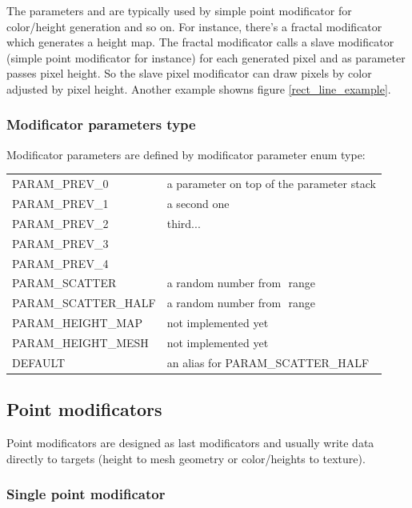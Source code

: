 \documentclass[9pt]{article}
\begin{document}
The parameters and are typically used by simple point modificator 
for color/height generation and so on. For instance, there's a fractal
modificator which generates a height map. The fractal modificator calls
a slave modificator (simple point modificator for instance) for each generated 
pixel and as parameter passes pixel height. So the slave pixel modificator can 
draw pixels by color adjusted by pixel height. Another example showns 
figure \ref{rect_line_example}.

\subsubsection*{Modificator parameters type}

Modificator parameters are defined by modificator parameter enum type:
\begin{center}
\begin{tabular}{|l||l|}
PARAM\_PREV\_0 & a parameter on top of the parameter stack \\
PARAM\_PREV\_1 & a second one \\
PARAM\_PREV\_2 & third... \\
PARAM\_PREV\_3 & \\
PARAM\_PREV\_4 & \\
PARAM\_SCATTER & a random number from \begin{math}<-1,1>\end{math} range \\
PARAM\_SCATTER\_HALF & a random number from \begin{math}<0,1>\end{math} range \\
PARAM\_HEIGHT\_MAP & not implemented yet \\
PARAM\_HEIGHT\_MESH & not implemented yet \\
DEFAULT & an alias for PARAM\_SCATTER\_HALF \\
\end{tabular}
\end{center}

\subsection{Point modificators}

Point modificators are designed as last modificators and usually write
data directly to targets (height to mesh geometry or color/heights to texture). 

\subsubsection{Single point modificator}
\end{document}
